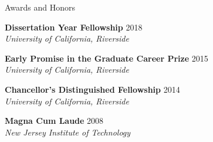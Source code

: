 \documentclass{Resume} %
\begin{document}
%
%
%
%
%
%
%
%
%


\begin{rSection}{Awards and Honors}

\textbf{Dissertation Year Fellowship} \hfill 2018 \\ \textit{University of California, Riverside}
  
\textbf{Early Promise in the Graduate Career Prize} \hfill 2015 \\ \textit{University of California, Riverside} 

\textbf{Chancellor's Distinguished Fellowship} \hfill 2014 \\ \textit{University of California, Riverside} 

\textbf{Magna Cum Laude} \hfill 2008 \\ \textit{New Jersey Institute of Technology} 

\end{rSection}


\end{document}
